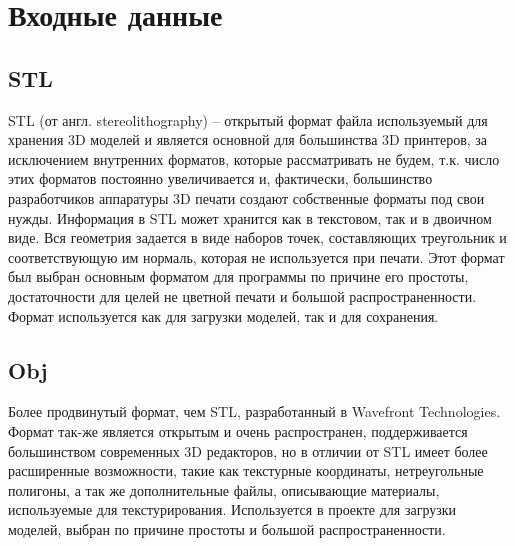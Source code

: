 \clearpage
\section{Входные данные}
\subsection{STL}
STL (от англ. stereolithography) -- открытый формат файла используемый для хранения 3D моделей и является основной для большинства 3D принтеров, за исключением внутренних форматов, которые рассматривать не будем, т.к. число этих форматов постоянно увеличивается и, фактически, большинство разработчиков аппаратуры 3D печати создают собственные форматы под свои нужды. Информация в STL может хранится как в текстовом, так и в двоичном виде. Вся геометрия задается в виде наборов точек, составляющих треугольник и соответствующую им нормаль, которая не используется при печати. Этот формат был выбран основным форматом для программы по причине его простоты, достаточности для целей не цветной печати и большой распространенности. Формат используется как для загрузки моделей, так и для сохранения.
\subsection{Obj}
Более продвинутый формат, чем STL, разработанный в Wavefront Technologies. Формат так-же является открытым и очень распространен, поддерживается большинством современных 3D редакторов, но в отличии от STL имеет более расширенные возможности, такие как текстурные координаты, нетреугольные полигоны, а так же дополнительные файлы, описывающие материалы, используемые для текстурирования. Используется в проекте для загрузки моделей, выбран по причине простоты и большой распространенности.
